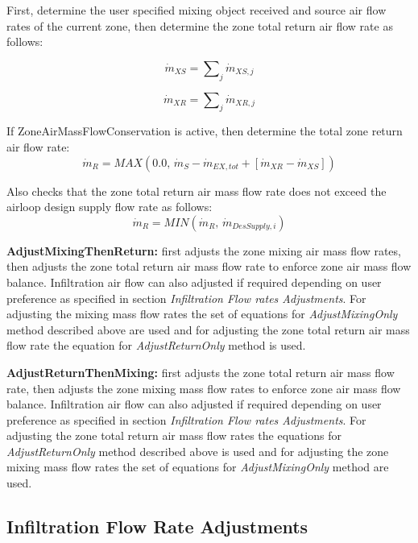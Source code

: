 First, determine the user specified mixing object received and source air flow rates of the current zone, then determine the zone total return air flow rate as follows:

\begin{equation}
{\dot m_{XS}} = \sum\nolimits_j {{{\dot m}_{XS,j}}}
\end{equation}

\begin{equation}
{\dot m_{XR}} = \sum\nolimits_j {{{\dot m}_{XR,j}}}
\end{equation}

If ZoneAirMassFlowConservation is active, then determine the total zone return air flow rate:
\begin{equation}
{\dot m_{R}} = MAX\left( {0.0,\,{{\dot m}_S} - {{\dot m}_{EX,tot}} + [{{\dot m}_{XR}} - {{\dot m}_{XS}}]} \right)
\end{equation}

Also checks that the zone total return air mass flow rate does not exceed the airloop design supply flow rate as follows:
\begin{equation}
{\dot m_{R}} = MIN\left( {{\dot m_{R}},\,{{\dot m}_{DesSupply,i}}} \right) 
\end{equation}

\textbf{AdjustMixingThenReturn:} first adjusts the zone mixing air mass flow rates, then adjusts the zone total return air mass flow rate to enforce zone air mass flow balance. Infiltration air flow can also adjusted if required depending on user preference as specified in section \textit{Infiltration Flow rates Adjustments}. For adjusting the mixing mass flow rates the set of equations for \textit{AdjustMixingOnly} method described above are used and for adjusting the zone total return air mass flow rate the equation for \textit{AdjustReturnOnly} method is used. 

\textbf{AdjustReturnThenMixing:} first adjusts the zone total return air mass flow rate, then adjusts the zone mixing mass flow rates to enforce zone air mass flow balance. Infiltration air flow can also adjusted if required depending on user preference as specified in section \textit{Infiltration Flow rates Adjustments}. For adjusting the zone total return air mass flow rates the equations for \textit{AdjustReturnOnly} method described above is used and for adjusting the zone mixing mass flow rates the set of equations for \textit{AdjustMixingOnly} method are used.

\subsection{Infiltration Flow Rate Adjustments}\label{infiltration-flow-rate-adjustments}

